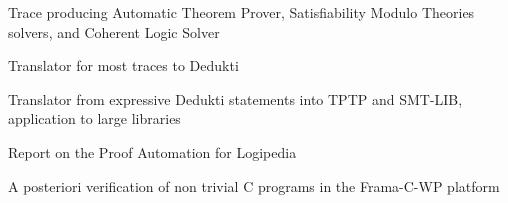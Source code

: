 \begin{workpackage}
\begin{wpdelivs}
  \begin{wpdeliv}[due=48,miles=??,id=ATPtrace2,dissem=PU,nature=DEM,lead=Lie]
    {Trace producing Automatic Theorem Prover, Satisfiability Modulo
      Theories solvers, and Coherent Logic Solver}
  \end{wpdeliv}

  \begin{wpdeliv}[due=48,miles=??,id=Trace2Dedukti2,dissem=PU,nature=DEM,lead=Imt]
    {Translator for most traces to Dedukti}
  \end{wpdeliv}

  \begin{wpdeliv}[due=48,miles=??,id=Dedukti2ATP2,dissem=PU,nature=DEM,lead=Sac]
    {Translator from expressive Dedukti statements into TPTP and
      SMT-LIB, application to large libraries}
  \end{wpdeliv}

  \begin{wpdeliv}[due=48,miles=??,id=ReadinessReport,dissem=PU,nature=R,lead=Inn]
    {Report on the Proof Automation for Logipedia}
  \end{wpdeliv}

  \begin{wpdeliv}[due=48,miles=??,id=Why3,dissem=PU,nature=DEM,lead=Cea]
    {A posteriori verification of non trivial C programs in the
      Frama-C-WP platform}
  \end{wpdeliv}

\end{wpdelivs}
\end{workpackage}

